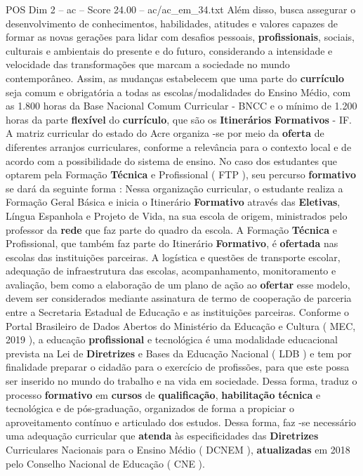 \begin{textsample}{POS Dim 2 – ac – Score 24.00 – ac/ac\_em\_34.txt}
Além disso, busca assegurar o desenvolvimento de conhecimentos, habilidades, atitudes e valores capazes de formar as novas gerações para lidar com desafios pessoais, \textbf{profissionais}, sociais, culturais e ambientais do presente e do futuro, considerando a intensidade e velocidade das transformações que marcam a sociedade no mundo contemporâneo.
Assim, as mudanças estabelecem que uma parte do \textbf{currículo} seja comum e obrigatória a todas as escolas/modalidades do Ensino Médio, com as 1.800 horas da Base Nacional Comum Curricular - BNCC e o mínimo de 1.200 horas da parte \textbf{flexível} do \textbf{currículo}, que são os \textbf{Itinerários} \textbf{Formativos} - IF.
A matriz curricular do estado do Acre organiza -se por meio da \textbf{oferta} de diferentes arranjos curriculares, conforme a relevância para o contexto local e de acordo com a possibilidade do sistema de ensino.
No caso dos estudantes que optarem pela Formação \textbf{Técnica} e Profissional ( FTP ), seu percurso \textbf{formativo} se dará da seguinte forma : Nessa organização curricular, o estudante realiza a Formação Geral Básica e inicia o Itinerário \textbf{Formativo} através das \textbf{Eletivas}, Língua Espanhola e Projeto de Vida, na sua escola de origem, ministrados pelo professor da \textbf{rede} que faz parte do quadro da escola.
A Formação \textbf{Técnica} e Profissional, que também faz parte do Itinerário \textbf{Formativo}, é \textbf{ofertada} nas escolas das instituições parceiras.
A logística e questões de transporte escolar, adequação de infraestrutura das escolas, acompanhamento, monitoramento e avaliação, bem como a elaboração de um plano de ação ao \textbf{ofertar} esse modelo, devem ser considerados mediante assinatura de termo de cooperação de parceria entre a Secretaria Estadual de Educação e as instituições parceiras.
Conforme o Portal Brasileiro de Dados Abertos do Ministério da Educação e Cultura ( MEC, 2019 ), a educação \textbf{profissional} e tecnológica é uma modalidade educacional prevista na Lei de \textbf{Diretrizes} e Bases da Educação Nacional ( LDB ) e tem por finalidade preparar o cidadão para o exercício de profissões, para que este possa ser inserido no mundo do trabalho e na vida em sociedade.
Dessa forma, traduz o processo \textbf{formativo} em \textbf{cursos} de \textbf{qualificação}, \textbf{habilitação} \textbf{técnica} e tecnológica e de pós-graduação, organizados de forma a propiciar o aproveitamento contínuo e articulado dos estudos.
Dessa forma, faz -se necessário uma adequação curricular que \textbf{atenda} às especificidades das \textbf{Diretrizes} Curriculares Nacionais para o Ensino Médio ( DCNEM ), \textbf{atualizadas} em 2018 pelo Conselho Nacional de Educação ( CNE ).

\end{textsample}
